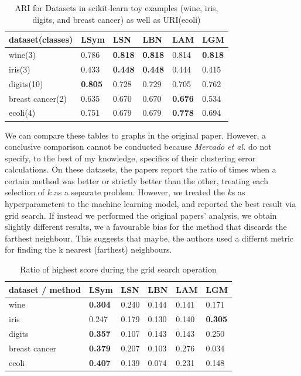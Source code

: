 \documentclass[11pt]{article}
\begin{document}
  \begin{table}[h!]
    \centering
    \begin{tabular}{| l | l | l | l | l | l | }
      \hline
      dataset(classes) & LSym & LSN & LBN & LAM & LGM \\
      \hline
      wine(3) & 0.786  &  \textbf{0.818}  &  \textbf{0.818}  &  0.814  &  \textbf{0.818} \\   
      iris(3) & 0.433  &  \textbf{0.448}  &  \textbf{0.448}  &  0.444  &  0.415 \\
      digits(10) & \textbf{0.805}  &  0.728  &  0.729  &  0.705  &  0.762\\
      breast cancer(2) & 0.635  &  0.670  &  0.670  &  \textbf{0.676}  &  0.534 \\
      ecoli(4) & 0.751  &  0.679  &  0.679  &  \textbf{0.778}  &  0.694 \\
      \hline
    \end{tabular}
    \caption{ARI for Datasets in scikit-learn toy examples (wine, iris, digits, 
    and breast cancer) as well as URI(ecoli)}
  \end{table}

    We can compare these tables to graphs in the original paper. However, a conclusive 
  comparison cannot be conducted because \emph{Mercado et al.} do not specify,
  to the best of my knowledge, specifics of their clustering error calculations.
  On these datasets, the papers report the ratio of times when a certain method 
  was better or strictly better than the other, treating each selection of $k$ 
  as a separate problem. However, we treated the $k$s as hyperparameters to the 
  machine learning model, and reported the best result via grid search. 
    If instead we performed the original papers' analysis, we obtain slightly
  different results, we a favourable bias for the method that discards the 
  farthest neighbour. This suggests that maybe, the authors used a differnt metric
  for finding the k nearest (farthest) neighbours.
  
  \begin{table}[h!]
    \centering
    \begin{tabular}{| l | l | l | l | l | l | }
      \hline
      dataset / method & LSym & LSN & LBN & LAM & LGM  \\ 
      \hline
      wine &  \textbf{0.304}  &  0.240  &  0.144  &  0.141  &  0.171 \\   
      iris &  0.247  &  0.179  &  0.130  &  0.140  &  \textbf{0.305} \\
      digits & \textbf{0.357}  &  0.107  &  0.143  &  0.143  &  0.250\\
      breast cancer & \textbf{0.379}  &  0.207  &  0.103  &  0.276  &  0.034\\
      ecoli &  \textbf{0.407}  &  0.139  &  0.074  &  0.231  &  0.148\\
      \hline
    \end{tabular}
    \caption{Ratio of highest score during the grid search operation}
  \end{table}
\end{document}
